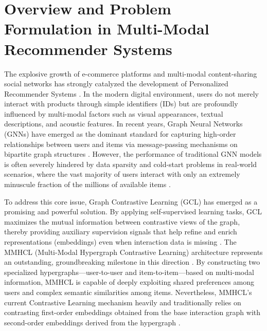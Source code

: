     \tableofcontents
    \clearpage
    \listoffigures
    \listoftables
    \clearpage
    
    \section{Overview and Problem Formulation in Multi-Modal Recommender Systems}
    
    The explosive growth of e-commerce platforms and multi-modal content-sharing social networks has strongly catalyzed the development of Personalized Recommender Systems \cite{raj2025unlockingmultimodal, chakraborty2021fashionrecsurvey}. In the modern digital environment, users do not merely interact with products through simple identifiers (IDs) but are profoundly influenced by multi-modal factors such as visual appearances, textual descriptions, and acoustic features. In recent years, Graph Neural Networks (GNNs) have emerged as the dominant standard for capturing high-order relationships between users and items via message-passing mechanisms on bipartite graph structures \cite{guo2025mmhcl, feng2025nlgcl}. However, the performance of traditional GNN models is often severely hindered by data sparsity and cold-start problems in real-world scenarios, where the vast majority of users interact with only an extremely minuscule fraction of the millions of available items \cite{raj2025unlockingmultimodal, zhang2025mllmrec}.
    
    To address this core issue, Graph Contrastive Learning (GCL) has emerged as a promising and powerful solution. By applying self-supervised learning tasks, GCL maximizes the mutual information between contrastive views of the graph, thereby providing auxiliary supervision signals that help refine and enrich representations (embeddings) even when interaction data is missing \cite{bachman2019miacrossviews, kim2024miheterophilygnn}. The MMHCL (Multi-Modal Hypergraph Contrastive Learning) architecture represents an outstanding, groundbreaking milestone in this direction \cite{guo2025mmhcl}. By constructing two specialized hypergraphs---user-to-user and item-to-item---based on multi-modal information, MMHCL is capable of deeply exploiting shared preferences among users and complex semantic similarities among items. Nevertheless, MMHCL's current Contrastive Learning mechanism heavily and traditionally relies on contrasting first-order embeddings obtained from the base interaction graph with second-order embeddings derived from the hypergraph \cite{guo2025mmhcl, han2025biviewhypergraph}.
    
